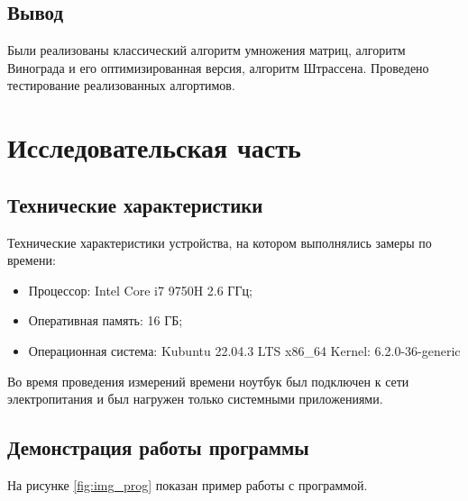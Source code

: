 \clearpage

\section*{Вывод}

Были реализованы классический алгоритм умножения матриц, алгоритм Винограда и его оптимизированная версия, алгоритм Штрассена.
Проведено тестирование реализованных алгортимов.

\clearpage

\chapter{Исследовательская часть}

\section{Технические характеристики}
Технические характеристики устройства, на котором выполнялись
замеры по времени:

\begin{itemize}
    \item Процессор: Intel Core i7 9750H 2.6 ГГц;
    \item Оперативная память: 16 ГБ;
    \item Операционная система: Kubuntu 22.04.3 LTS x86\_64 Kernel: 6.2.0-36-generic
\end{itemize}

Во время проведения измерений времени ноутбук был подключен к сети электропитания и был нагружен только системными приложениями.

\section{Демонстрация работы программы}

На рисунке \ref{fig:img_prog} показан пример работы с программой.


